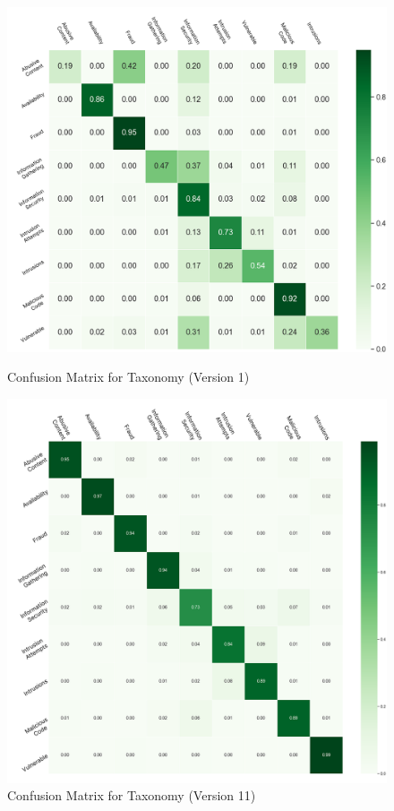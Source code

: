 \begin{figure}[h!]
    \centering
    \begin{minipage}{0.49\textwidth}
        \centering
        \includegraphics[width=\textwidth]{ch4/assets/v1_confusion_taxonomy.png}
        \caption{Confusion Matrix for Taxonomy (Version 1)}
        \label{fig:confusion_taxonomy_v1}
    \end{minipage}
    \hfill
    \begin{minipage}{0.49\textwidth}
        \centering
        \includegraphics[width=\textwidth]{ch4/assets/v11_confusion_taxonomy.png}
        \caption{Confusion Matrix for Taxonomy (Version 11)}
        \label{fig:confusion_taxonomy_v11}
    \end{minipage}
\end{figure}

